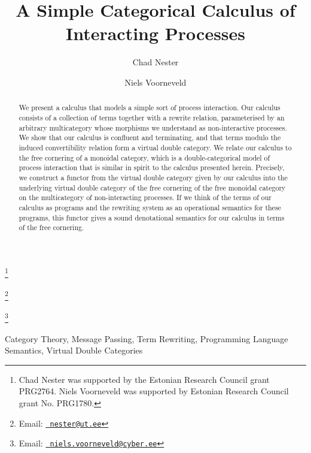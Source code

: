 \documentclass[twoside,11pt,final]{entics}
\begin{document}
\begin{frontmatter}
  \title{A Simple Categorical Calculus of Interacting Processes} 						%
 \thanks[ALL]{Chad Nester was supported by the Estonian Research Council grant PRG2764. Niels Voorneveld was supported by Estonian Research Council grant No. PRG1780.}   %
  \author{Chad Nester}	%
   \author{Niels Voorneveld}		%
   \address[a]{University of Tartu\\				%
    Tartu, Estonia}  							
   \thanks[myemail]{Email: \href{mailto:nester@ut.ee} {\texttt{\normalshape
        nester@ut.ee}}} 
  \address[b]{Cybernetica AS\\
    Tallinn, Estonia} 
  \thanks[coemail]{Email:  \href{mailto:niels.voorneveld@cyber.ee} {\texttt{\normalshape
        niels.voorneveld@cyber.ee}}}
\begin{abstract} 
  We present a calculus that models a simple sort of process interaction. Our calculus consists of a collection of terms together with a rewrite relation, parameterised by an arbitrary multicategory whose morphisms we understand as non-interactive processes. We show that our calculus is confluent and terminating, and that terms modulo the induced convertibility relation form a virtual double category. We relate our calculus to the free cornering of a monoidal category, which is a double-categorical model of process interaction that is similar in spirit to the calculus presented herein. Precisely, we construct a functor from the virtual double category given by our calculus into the underlying virtual double category of the free cornering of the free monoidal category on the multicategory of non-interacting processes. If we think of the terms of our calculus as programs and the rewriting system as an operational semantics for these programs, this functor gives a sound denotational semantics for our calculus in terms of the free cornering.
\end{abstract}
\begin{keyword}
  Category Theory,
  Message Passing,
  Term Rewriting,
  Programming Language Semantics,
  Virtual Double Categories
  \end{keyword}
\end{frontmatter}
\end{document}
